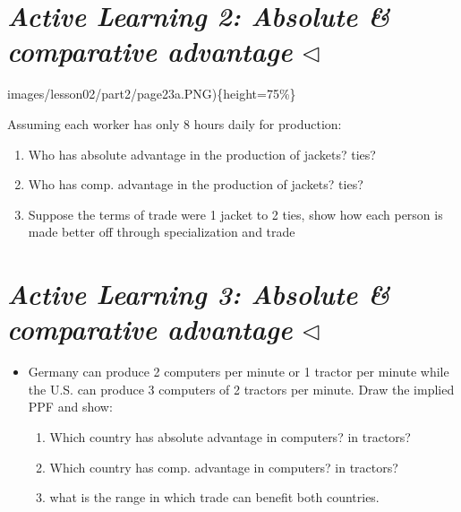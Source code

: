 \documentclass[
]{book}
\begin{document}
\hypertarget{active-learning-2-absolute-comparative-advantage-triangleleft}{%
\section{\texorpdfstring{\emph{Active Learning 2: Absolute \& comparative advantage} \(\triangleleft\)}{Active Learning 2: Absolute \& comparative advantage \textbackslash triangleleft}}\label{active-learning-2-absolute-comparative-advantage-triangleleft}}

images/lesson02/part2/page23a.PNG)\{height=75\%\}

\small

Assuming each worker has only 8 hours daily for production:

\begin{enumerate}
\def\labelenumi{\alph{enumi}.}
\item
  Who has absolute advantage in the production of jackets? ties?
\item
  Who has comp. advantage in the production of jackets? ties?
\item
  Suppose the terms of trade were 1 jacket to 2 ties, show how each person is made better off through specialization and trade
\end{enumerate}

\hypertarget{active-learning-3-absolute-comparative-advantage-triangleleft}{%
\section{\texorpdfstring{\emph{Active Learning 3: Absolute \& comparative advantage} \(\triangleleft\)}{Active Learning 3: Absolute \& comparative advantage \textbackslash triangleleft}}\label{active-learning-3-absolute-comparative-advantage-triangleleft}}

\begin{itemize}
\item
  Germany can produce 2 computers per minute or 1 tractor per minute while the U.S. can produce 3 computers of 2 tractors per minute. Draw the implied PPF and show:

  \begin{enumerate}
  \def\labelenumi{\alph{enumi}.}
  \item
    Which country has absolute advantage in computers? in tractors?
  \item
    Which country has comp. advantage in computers? in tractors?
  \item
    what is the range in which trade can benefit both countries.
  \end{enumerate}
\end{itemize}
\end{document}
